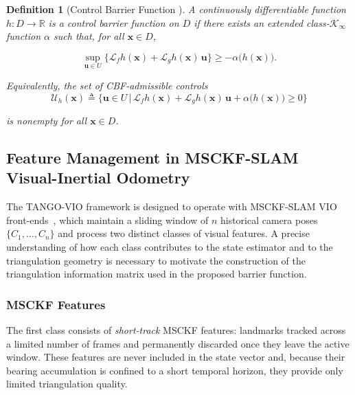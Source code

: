 \documentclass[journal]{IEEEtran}
\newtheorem{definition}{Definition}[section]
\begin{document}
\begin{definition} [Control Barrier Function \cite{ames}]
    A continuously differentiable function $h:D\to\mathbb{R}$ is a control barrier function on $D$ if there exists an extended class-$\mathcal{K}_\infty$ function $\alpha$ such that, for all $\bm{x} \in D$,
    
    \begin{equation}
    \label{cbf1}
        \sup_{\bm{u}\in U}\Big\{\mathcal{L}_f h(\bm{x})+\mathcal{L}_g h(\bm{x})\,\bm{u}\Big\}
        \ge -\alpha\!\big(h(\bm{x})\big).
    \end{equation}
    
    Equivalently, the set of CBF-admissible controls
    \begin{equation}
    \label{cbf2}
        \mathcal{U}_h(\bm{x}) \triangleq \Big\{\bm{u}\in U \,\big|\, \mathcal{L}_f h(\bm{x})+\mathcal{L}_g h(\bm{x})\,\bm{u}+\alpha\!\big(h(\bm{x})\big)\ge 0\Big\}
    \end{equation}
    
is nonempty for all $\bm{x}\in D$.

\end{definition}

\subsection{Feature Management in MSCKF-SLAM Visual-Inertial Odometry}
\label{msckfFeatureManagement}

The TANGO-VIO framework is designed to operate with MSCKF-SLAM VIO front-ends~\cite{li2013optimization,delaune2020xvio,geneva2020openvins}, which maintain a sliding window of $n$ historical camera poses $\{C_1,\ldots,C_n\}$ and process two distinct classes of visual features. A precise understanding of how each class contributes to the state estimator and to the triangulation geometry is necessary to motivate the construction of the triangulation information matrix used in the proposed barrier function.

\subsubsection*{MSCKF Features}
The first class consists of \emph{short-track} MSCKF features: landmarks tracked across a limited number of frames and permanently discarded once they leave the active window. These features are never included in the state vector and, because their bearing accumulation is confined to a short temporal horizon, they provide only limited triangulation quality.
\end{document}

